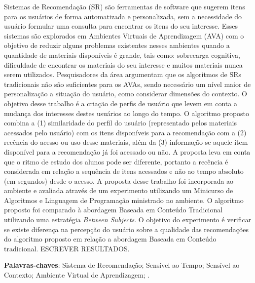 \begin{resumo}
  Sistemas de Recomendação (SR) são ferramentas de software que sugerem itens para os usuários de forma automatizada e personalizada,
  sem a necessidade do usuário formular uma consulta para encontrar os itens do seu interesse. Esses sistemas são
  explorados em Ambientes Virtuais de Aprendizagem (AVA) com o objetivo de reduzir alguns problemas existentes nesses ambientes
  quando a quantidade de materiais disponíveis é grande, tais como: sobrecarga cognitiva, dificuldade de encontrar os materiais
  do seu interesse e muitos materiais nunca serem utilizados. Pesquisadores da área argumentam que os algoritmos de SRs tradicionais não são suficientes para os AVAs,
  sendo necessário um nível maior de personalização a situação do usuário, como considerar dimensões do contexto. O objetivo
  desse trabalho é a criação de perfis de usuário que levem em conta a mudança dos interesses destes usuários
  ao longo do tempo. O algoritmo proposto combina a (1) similaridade do perfil do usuário (representado
  pelos materiais acessados pelo usuário) com os itens disponíveis para a recomendação com a (2) recência do acesso ou uso
  desse materiais, além da (3) informação se aquele item disponível para a recomendação já foi acessado ou não. A
  proposta leva em conta que o ritmo de estudo dos alunos pode ser diferente, portanto a recência é considerada em relação
  a sequência de itens acessados e não ao tempo absoluto (em segundos) desde o acesso. A proposta desse trabalho foi
  incorporada ao ambiente \adaptweb e avaliada através de um experimento utilizando um Minicurso de Algoritmos e Linguagem de Programação
  ministrado no ambiente. O algoritmo proposto foi comparado à abordagem Baseada em Conteúdo Tradicional utilizando uma
  estratégia \textit{Between Subjects}. O objetivo do experimento é verificar se existe diferença na percepção do usuário
  sobre a qualidade das recomendações do algoritmo proposto em relação a abordagem Baseada em Conteúdo tradicional.
  ESCREVER RESULTADOS.

  \vspace{\onelineskip}

  \noindent
  \textbf{Palavras-chaves}: Sistema de Recomendação; Sensível ao Tempo; Sensível ao Contexto; Ambiente Virtual de Aprendizagem; \adaptweb.
\end{resumo}

